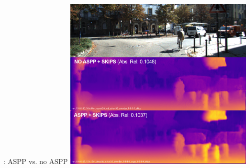 \documentclass[11pt]{beamer}
\begin{document}
\begin{frame}[c]{\subsecname: ASPP vs. no ASPP}
\centering
\includegraphics[width=0.7\textwidth]{figures/images/skipsvsnoskips1_error.png}
\end{frame}
\end{document}
